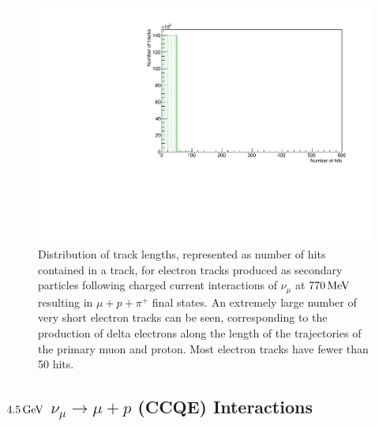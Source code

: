 \begin{figure}
\centering
\includegraphics[angle=-90,width=\textwidth]{chapters/particleid_images/ccpi-770-electron-lengths}
\caption[Track length distribution for $e^{-}$ from $770\MeV$ neutrinos (CCPi)]{\label{fig:ccpi-electron-lengths-770MeV}Distribution of track lengths, represented as number of hits contained in a track, for electron tracks produced as secondary particles following charged current interactions of $\nu_\mu$ at $770\MeV$ resulting in $\mu + p + \pi^+$ final states. An extremely large number of very short electron tracks can be seen, corresponding to the production of delta electrons along the length of the trajectories of the primary muon and proton. Most electron tracks have fewer than 50 hits.}
\end{figure}

\subsection{$4.5\,\mathrm{GeV}$ $\nu_\mu \rightarrow \mu + p$ (CCQE) Interactions}
